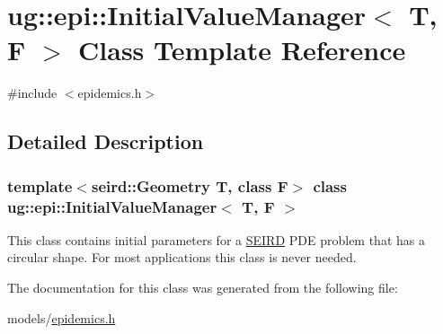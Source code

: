\hypertarget{classug_1_1epi_1_1_initial_value_manager}{}\section{ug\+:\+:epi\+:\+:Initial\+Value\+Manager$<$ T, F $>$ Class Template Reference}
\label{classug_1_1epi_1_1_initial_value_manager}


{\ttfamily \#include $<$epidemics.\+h$>$}



\subsection{Detailed Description}
\subsubsection*{template$<$seird\+::\+Geometry T, class F$>$\newline
class ug\+::epi\+::\+Initial\+Value\+Manager$<$ T, F $>$}

This class contains initial parameters for a \hyperlink{classug_1_1epi_1_1_s_e_i_r_d}{S\+E\+I\+RD} P\+DE problem that has a circular shape. For most applications this class is never needed. 

The documentation for this class was generated from the following file\+:\begin{DoxyCompactItemize}
\item 
models/\hyperlink{epidemics_8h}{epidemics.\+h}\end{DoxyCompactItemize}
